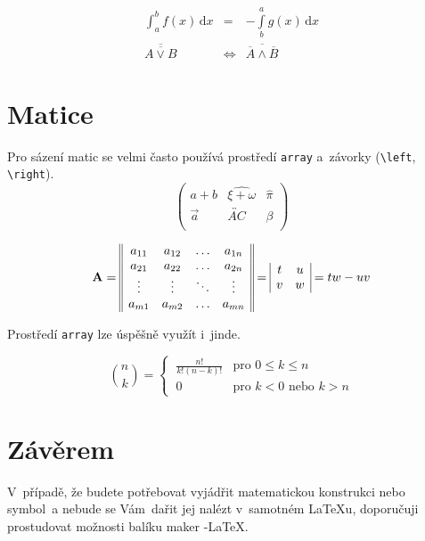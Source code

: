 \documentclass[twocolumn, a4paper, titlepage, 11pt]{article}
\begin{document}
\begin{eqnarray}
\int_a^b f(x)\,\mathrm{d}x     &        =        & -\int\limits_b^a g(x)\,\mathrm{d}x\\
\overline{\overline{A \vee B}} & \Leftrightarrow & \overline{\overline{A} \wedge \overline{B} }
\end{eqnarray}

\section{Matice}


Pro sázení matic se velmi často používá prostředí \texttt{array} a~závorky
(\verb|\left|, \verb|\right|).
$$ \left( \begin{array}{ccc}
a+b & \widehat{\xi+\omega} & \widehat{\pi} \\
\overrightarrow{a} & \overleftrightarrow{AC} & \beta \\
\end{array} \right) $$ 


$$\text{\textbf{A}} = \begin{array}{||cccc||}
a_{11} & a_{12} & \ldots & a_{1n} \\
a_{21} & a_{22} & \ldots & a_{2n} \\
\vdots & \vdots & \ddots & \vdots \\
a_{m1} & a_{m2} & \ldots & a_{mn} \end{array} = \begin{array}{|cc|}
t & u \\
v & w \end{array} = tw - uv$$

Prostředí \texttt{array} lze úspěšně využít i~jinde.

$$ \binom{n}{k} = \begin{cases}
\ \frac{n!}{k!(n-k)!} &  \text{pro } 0 \leq k \leq n \\
\ 0 & \text{pro } k <  0 \text{ nebo } k > n

\end{cases}$$



\section{Závěrem}
V~případě, že budete potřebovat vyjádřit matema\-tickou konstrukci nebo symbol~a nebude 
se Vám~dařit jej nalézt v~samotném \LaTeX u, doporučuji prostudo\-vat možnosti
balíku maker \AmS-\LaTeX.
\end{document}
